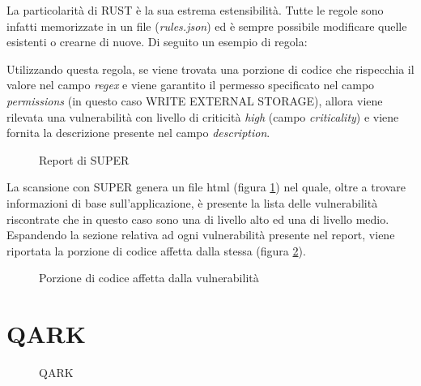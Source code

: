 La particolarità di RUST è la sua estrema estensibilità. Tutte le regole sono infatti memorizzate in un file (\emph{rules.json}) ed è sempre possibile modificare quelle esistenti o crearne di nuove. Di seguito un esempio di regola:



Utilizzando questa regola, se viene trovata una porzione di codice che rispecchia il valore nel campo \emph{regex} e viene garantito il permesso specificato nel campo \emph{permissions} (in questo caso WRITE EXTERNAL STORAGE), allora viene rilevata una vulnerabilità con livello di criticità \emph{high} (campo \emph{criticality}) e viene fornita la descrizione presente nel campo \emph{description}.

\begin{figure}[h]
	\centering 
	\caption{Report di SUPER}
	\label{fig:superResults} 
\end{figure}

La scansione con SUPER genera un file html (figura \ref{fig:superResults}) nel quale, oltre a trovare informazioni di base sull'applicazione, è presente la lista delle vulnerabilità riscontrate che in questo caso sono una di livello alto ed una di livello medio. Espandendo la sezione relativa ad ogni vulnerabilità presente nel report, viene riportata la porzione di codice affetta dalla stessa (figura \ref{fig:superVuln}). 

\begin{figure}[h]
	\centering 
	\caption{Porzione di codice affetta dalla vulnerabilità}
	\label{fig:superVuln} 
\end{figure}


\section{QARK}
\begin{figure}[h]
	\centering 
	\caption{QARK}
	\label{fig:qark}
\end{figure}


